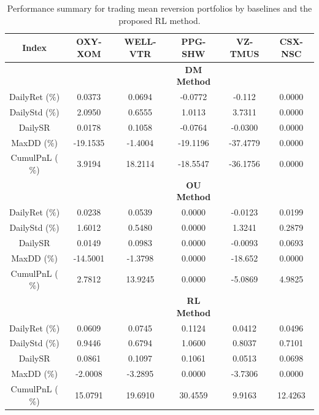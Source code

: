 \documentclass{article}
\begin{document}
\begin{table}
\centering
\begin{tabular}{c|ccccc}
\toprule
\textbf{Index} & \textbf{OXY-XOM} & \textbf{WELL-VTR} & \textbf{PPG-SHW} & \textbf{VZ-TMUS} & \textbf{CSX-NSC}  \\ 
\midrule
&&& \textbf{DM Method}\\
\midrule
DailyRet ($\%$) &  0.0373 & 0.0694 & -0.0772  & -0.112     & 0.0000 \\ 
DailyStd ($\%$) &  2.0950 & 0.6555 & 1.0113   & 3.7311     & 0.0000 \\ 
DailySR 	   &   0.0178 & 0.1058 & -0.0764  & -0.0300    & 0.0000 \\
MaxDD ($\%$)   & -19.1535 & -1.4004 & -19.1196 & -37.4779  & 0.0000 \\ 
CumulPnL ($\%$)  & 3.9194 & 18.2114 & -18.5547 & -36.1756  & 0.0000 \\  
\midrule
&&& \textbf{OU Method} \\
\midrule
DailyRet ($\%$) & 0.0238   & 0.0539  & 0.0000 & -0.0123 & 0.0199 \\ 
DailyStd ($\%$) & 1.6012   & 0.5480  & 0.0000 & 1.3241  & 0.2879 \\ 
DailySR 	    & 0.0149   & 0.0983  & 0.0000 & -0.0093 & 0.0693 \\
MaxDD ($\%$)    & -14.5001 & -1.3798 & 0.0000 & -18.652 & 0.0000 \\ 
CumulPnL ($\%$) & 2.7812   & 13.9245 & 0.0000 & -5.0869 & 4.9825 \\  
\midrule
&&& \textbf{RL Method}\\
\midrule
DailyRet ($\%$) & 0.0609  & 0.0745  & 0.1124   &  0.0412  & 0.0496 \\ 
DailyStd ($\%$) & 0.9446  & 0.6794  & 1.0600   &  0.8037  & 0.7101 \\ 
DailySR 	    & 0.0861  & 0.1097  & 0.1061   &  0.0513  & 0.0698 \\
MaxDD ($\%$)    & -2.0008 & -3.2895 & 0.0000   &  -3.7306 & 0.0000 \\ 
CumulPnL ($\%$) & 15.0791 & 19.6910 & 30.4559  &  9.9163  & 12.4263 \\ 
\bottomrule
\end{tabular} 
\caption{Performance summary for trading mean reversion portfolios by baselines and the proposed RL method.}
\label{tab4} 
\end{table}
\end{document}
